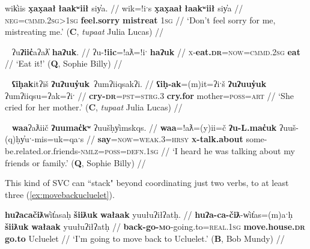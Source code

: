 \ex \label{ex:dontmistreatme}
\begingl
\glpreamble wik̓iis \textbf{x̣ax̣aał} \textbf{łaakʷiił} siy̓a. //
\gla wik=!iˑs \textbf{x̣ax̣aał} \textbf{łaakʷiił} siy̓a //
\glb \textsc{neg}=\textsc{cmmd.2sg>1sg} \textbf{feel.sorry} \textbf{mistreat} \textsc{1sg} //
\glft `Don't feel sorry for me, mistreating me.' (\textbf{C}, \textit{tupaat} Julia Lucas) //
\endgl
\xe

\ex~ \label{ex:eateat}
\begingl
\glpreamble ʔu\textbf{ʔiic̓}aʔaƛ̓ \textbf{haʔuk}. //
\gla ʔu-\textbf{!iic}=!aƛ=!iˑ \textbf{haʔuk} //
\glb \textsc{x}-\textbf{eat.\textsc{dr}}=\textsc{now}=\textsc{cmmd.2sg} \textbf{eat} //
\glft `Eat it!' (\textbf{Q}, Sophie Billy) //
\endgl
\xe

\ex~ \label{ex:crycry}
\begingl
\glpreamble \textbf{ʕiḥak}itʔiš \textbf{ʔuʔuuy̓uk}\footnotemark\ ʔumʔiiqsakʔi. //
\gla \textbf{ʕiḥ-ak}=(m)it=ʔiˑš \textbf{ʔuʔuuy̓uk} ʔumʔiiqsu=ʔak=ʔiˑ //
\glb \textbf{cry-\textsc{dr}}=\textsc{pst}=\textsc{strg.3} \textbf{cry.for} mother=\textsc{poss}=\textsc{art} //
\glft `She cried for her mother.' (\textbf{C}, \textit{tupaat} Julia Lucas) //
\endgl
\xe


\ex~ \label{ex:sayabout}
\begingl
\glpreamble \textbf{waa}ʔaƛiič \textbf{ʔuumac̓kʷ} ʔuušḥy̓imskqs. //
\gla \textbf{waa}=!aƛ=(y)ii=č \textbf{ʔu-L.mac̓uk} ʔuuš-(q)ḥy̓uˑ-mis=uk=qaˑs //
\glb \textbf{say}=\textsc{now}=\textsc{weak.3}=\textsc{hrsy} \textbf{\textsc{x}-talk.about} some-be.related.or.friends-\textsc{nmlz}=\textsc{poss}=\textsc{defn.1sg} //
\glft `I heard he was talking about my friends or family.' (\textbf{Q}, Sophie Billy) //
\endgl
\xe

This kind of SVC can ``stack" beyond coordinating just two verbs, to at least three (\ref{ex:movebackucluelet}).

\begin{comment}
\ex \label{ex:onlygotostore}
\begingl
\glpreamble \textbf{ʔanasiła}ʔi \textbf{kuw̓iła} \textbf{ʔucačiƛ} makuwił. //
\gla \textbf{ʔana-siła}=!iˑ \textbf{kuw̓iła} \textbf{ʔu-ca-čiƛ} makuwił //
\glb \textbf{only-do}=\textsc{cmmd.2sg} \textbf{go.ahead} \textbf{\textsc{x}-go.to-\textsc{mo}} store //
\glft `Just go to the store.' (\textbf{C}, \textit{tupaat} Julia Lucas) //
\endgl
\xe
\end{comment}

\ex \label{ex:movebackucluelet}
\begingl
\glpreamble \textbf{huʔacačiƛ}w̓it̓asaḥ \textbf{šiiƛuk} \textbf{wałaak} yuułuʔiłʔatḥ. //
\gla \textbf{huʔa-ca-čiƛ}-w̓it̓as=(m)aˑḥ \textbf{šiiƛuk} \textbf{wałaak} yuułuʔiłʔatḥ //
\glb \textbf{back-go-\textsc{mo}}-going.to=\textsc{real.1sg} \textbf{move.house.\textsc{dr}} \textbf{go.to} Ucluelet //
\glft `I'm going to move back to Ucluelet.' (\textbf{B}, Bob Mundy) //
\endgl
\xe


